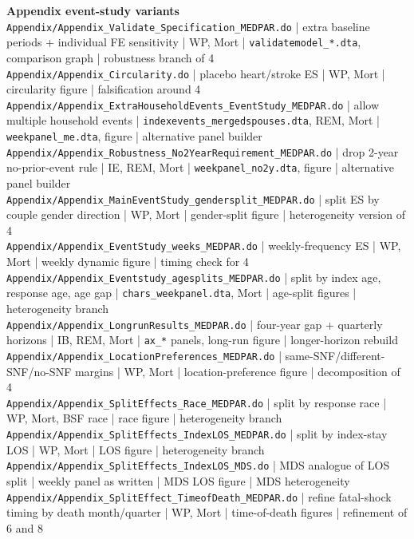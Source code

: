 \documentclass[11pt]{article}
\begin{document}
{\smallskip
\textbf{Appendix event-study variants}\\
\nolinkurl{Appendix/Appendix_Validate_Specification_MEDPAR.do} | extra baseline periods + individual FE sensitivity | WP, Mort | \nolinkurl{validatemodel_*.dta}, comparison graph | robustness branch of 4\\
\nolinkurl{Appendix/Appendix_Circularity.do} | placebo heart/stroke ES | WP, Mort | circularity figure | falsification around 4\\
\nolinkurl{Appendix/Appendix_ExtraHouseholdEvents_EventStudy_MEDPAR.do} | allow multiple household events | \nolinkurl{indexevents_mergedspouses.dta}, REM, Mort | \nolinkurl{weekpanel_me.dta}, figure | alternative panel builder\\
\nolinkurl{Appendix/Appendix_Robustness_No2YearRequirement_MEDPAR.do} | drop 2-year no-prior-event rule | IE, REM, Mort | \nolinkurl{weekpanel_no2y.dta}, figure | alternative panel builder\\
\nolinkurl{Appendix/Appendix_MainEventStudy_gendersplit_MEDPAR.do} | split ES by couple gender direction | WP, Mort | gender-split figure | heterogeneity version of 4\\
\nolinkurl{Appendix/Appendix_EventStudy_weeks_MEDPAR.do} | weekly-frequency ES | WP, Mort | weekly dynamic figure | timing check for 4\\
\nolinkurl{Appendix/Appendix_Eventstudy_agesplits_MEDPAR.do} | split by index age, response age, age gap | \nolinkurl{chars_weekpanel.dta}, Mort | age-split figures | heterogeneity branch\\
\nolinkurl{Appendix/Appendix_LongrunResults_MEDPAR.do} | four-year gap + quarterly horizons | IB, REM, Mort | \nolinkurl{ax_*} panels, long-run figure | longer-horizon rebuild\\
\nolinkurl{Appendix/Appendix_LocationPreferences_MEDPAR.do} | same-SNF/different-SNF/no-SNF margins | WP, Mort | location-preference figure | decomposition of 4\\
\nolinkurl{Appendix/Appendix_SplitEffects_Race_MEDPAR.do} | split by response race | WP, Mort, BSF race | race figure | heterogeneity branch\\
\nolinkurl{Appendix/Appendix_SplitEffects_IndexLOS_MEDPAR.do} | split by index-stay LOS | WP, Mort | LOS figure | heterogeneity branch\\
\nolinkurl{Appendix/Appendix_SplitEffects_IndexLOS_MDS.do} | MDS analogue of LOS split | weekly panel as written | MDS LOS figure | MDS heterogeneity\\
\nolinkurl{Appendix/Appendix_SplitEffect_TimeofDeath_MEDPAR.do} | refine fatal-shock timing by death month/quarter | WP, Mort | time-of-death figures | refinement of 6 and 8\\

}
\end{document}
